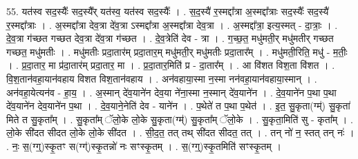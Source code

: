 \documentclass[17pt]{extarticle}
\begin{document}
55. यत॑स्व सद॒स्यैः᳚ सद॒स्यै᳚र् यत॑स्व॒ यत॑स्व सद॒स्यैः᳚ । . स॒द॒स्यै॑ र॒स्मद्दा᳚त्रा अ॒स्मद्दा᳚त्राः सद॒स्यैः᳚ सद॒स्यै॑ र॒स्मद्दा᳚त्राः । . अ॒स्मद्दा᳚त्रा देव॒त्रा दे॑व॒त्रा ऽस्मद्दा᳚त्रा अ॒स्मद्दा᳚त्रा देव॒त्रा । . अ॒स्मद्दा᳚त्रा॒ इत्य॒स्मत् - दा॒त्राः॒ । . दे॒व॒त्रा ग॑च्छत गच्छत देव॒त्रा दे॑व॒त्रा ग॑च्छत । . दे॒व॒त्रेति॑ देव - त्रा । . ग॒च्छ॒त॒ मधु॑मती॒र् मधु॑मतीर् गच्छत गच्छत॒ मधु॑मतीः । . मधु॑मतीः प्रदा॒तार॑म् प्रदा॒तार॒म् मधु॑मती॒र् मधु॑मतीः प्रदा॒तार᳚म् । . मधु॑मती॒रिति॒ मधु॑ - म॒तीः॒ । . प्र॒दा॒तार॒ मा प्र॑दा॒तार॑म् प्रदा॒तार॒ मा । . प्र॒दा॒तार॒मिति॑ प्र - दा॒तार᳚म् । . आ वि॑शत विश॒ता वि॑शत । . वि॒श॒तान॑वहा॒यान॑वहाय विशत विश॒तान॑वहाय । . अन॑वहाया॒स्मा न॒स्मा नन॑वहा॒यान॑वहाया॒स्मान् । . अन॑वहा॒येत्यन॑व - हा॒य॒ । . अ॒स्मान् दे॑व॒याने॑न देव॒या ने॑ना॒स्मा न॒स्मान् दे॑व॒याने॑न । . दे॒व॒याने॑न प॒था प॒था दे॑व॒याने॑न देव॒याने॑न प॒था । . दे॒व॒याने॒नेति॑ देव - याने॑न । . प॒थेते॑ त प॒था प॒थेत॑ । . इ॒त॒ सु॒कृता(ग्म्॑) सु॒कृता॑ मिते त सु॒कृता᳚म् । . सु॒कृता᳚म् ॅलो॒के लो॒के सु॒कृता(ग्म्॑) सु॒कृता᳚म् ॅलो॒के । . सु॒कृता॒मिति॑ सु - कृता᳚म् । . लो॒के सी॑दत सीदत लो॒के लो॒के सी॑दत । . सी॒द॒त॒ तत् तथ् सी॑दत सीदत॒ तत् । . तन् नो॑ न॒ स्तत् तन् नः॑ । . नः॒ स॒(ग्ग्॒)स्कृ॒तꣳ स(ग्ग्॑)स्कृ॒तन्नो॑ नः सꣳस्कृ॒तम् । . स॒(ग्ग्॒)स्कृ॒तमिति॑ सꣳस्कृ॒तम् । \newline
\end{document}
